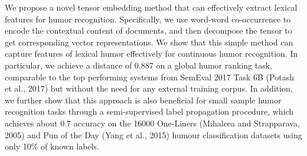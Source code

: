 We propose a novel tensor embedding method that can effectively extract lexical features for humor recognition. Specifically, we use word-word co-occurrence to encode the contextual content of documents, and then decompose the tensor to get corresponding vector representations. We show that this simple method can capture features of lexical humor effectively for continuous humor recognition. In particular, we achieve a distance of 0.887 on a global humor ranking task, comparable to the top performing systems from SemEval 2017 Task 6B (Potash et al., 2017) but without the need for any external training corpus. In addition, we further show that this approach is also beneficial for small sample humor recognition tasks through a semi-supervised label propagation procedure, which achieves about 0.7 accuracy on the 16000 One-Liners (Mihalcea and Strapparava, 2005) and Pun of the Day (Yang et al., 2015) humour classification
datasets using only 10\% of known labels.